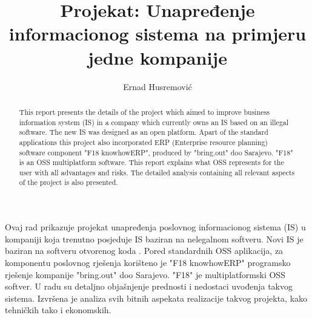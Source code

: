 \documentclass[times, utf8, seminar]{fit}
\begin{document}
\title{Projekat: Unapređenje informacionog sistema na primjeru jedne kompanije}

\author{Ernad Husremović}


\maketitle

\tableofcontents

\listoftables
\listoffigures

\begin{sazetak}

Ovaj rad prikazuje projekat unapređenja poslovnog informacionog sistema (IS) u kompaniji koja trenutno posjeduje IS baziran na nelegalnom softveru. 
Novi IS je baziran na softveru otvorenog koda .
Pored standardnih OSS aplikacija, za komponentu poslovnog rješenja korišteno je "F18 knowhowERP" programsko rješenje kompanije "bring.out" doo Sarajevo. "F18" je multiplatformski OSS softver.
U radu su detaljno objašnjenje prednosti i nedostaci uvođenja takvog sistema.
Izvršena je analiza svih bitnih aspekata realizacije takvog projekta, kako tehničkih tako i ekonomskih. 

\end{sazetak}

\begin{abstract}

This report presents the details of the project which aimed to improve business information system (IS) in a company which currently owns an IS based on an illegal software. The new IS was designed as an open platform. Apart of the standard applications this project also incorporated ERP (Enterprise resource planning) software component "F18 knowhowERP", produced by "bring.out" doo Sarajevo. "F18" is an OSS multiplatform software. This report explains what OSS represents for the user with all advantages and risks. The detailed analysis containing all relevant aspects of the project is also presented.

\end{abstract}
\end{document}
